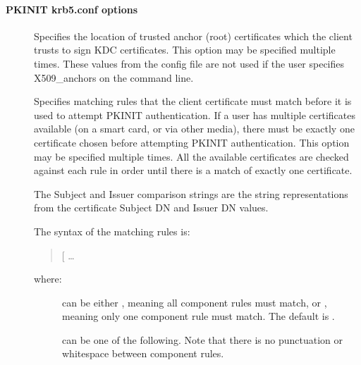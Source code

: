 \documentclass[letterpaper,10pt,english]{sphinxmanual}
\begin{document}
\paragraph{PKINIT krb5.conf options}
\label{\detokenize{admin/conf_files/krb5_conf:pkinit-krb5-conf-options}}\begin{description}
\item[{}] \leavevmode
Specifies the location of trusted anchor (root) certificates which
the client trusts to sign KDC certificates.  This option may be
specified multiple times.  These values from the config file are
not used if the user specifies X509\_anchors on the command line.

\item[{}] \leavevmode
Specifies matching rules that the client certificate must match
before it is used to attempt PKINIT authentication.  If a user has
multiple certificates available (on a smart card, or via other
media), there must be exactly one certificate chosen before
attempting PKINIT authentication.  This option may be specified
multiple times.  All the available certificates are checked
against each rule in order until there is a match of exactly one
certificate.

The Subject and Issuer comparison strings are the 
string representations from the certificate Subject DN and Issuer
DN values.

The syntax of the matching rules is:
\begin{quote}

{[}\sphinxstyleemphasis{relation-operator}{]} …
\end{quote}

where:
\begin{description}
\item[{}] \leavevmode
can be either \sphinxcode{\&\&}, meaning all component rules must match,
or \sphinxcode{\textbar{}\textbar{}}, meaning only one component rule must match.  The
default is \sphinxcode{\&\&}.

\item[{}] \leavevmode
can be one of the following.  Note that there is no
punctuation or whitespace between component rules.
\begin{quote}


\end{quote}
\end{description}
\end{description}
\end{document}
